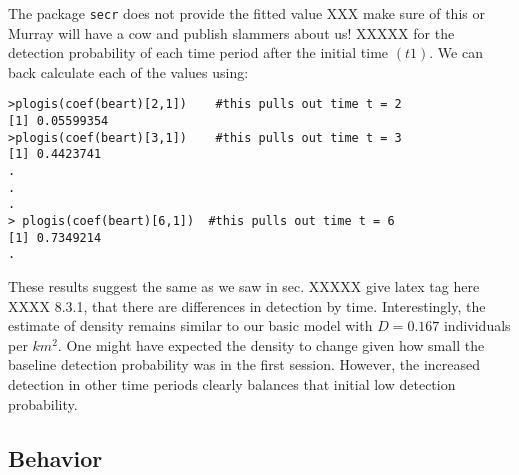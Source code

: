 The package \mbox{\tt secr} does not provide the fitted value XXX make
sure of this or Murray will have a cow and publish slammers about us! XXXXX
for the
detection probability of each time period after the initial time
$(t1)$.  
 We can back calculate each of the values using:
{\small
\begin{verbatim}
>plogis(coef(beart)[2,1])    #this pulls out time t = 2
[1] 0.05599354
>plogis(coef(beart)[3,1])    #this pulls out time t = 3
[1] 0.4423741
.
.
.
> plogis(coef(beart)[6,1])  #this pulls out time t = 6
[1] 0.7349214
.
\end{verbatim}
}
These results suggest the same as we saw in sec. XXXXX give latex tag
here  XXXX 8.3.1, that there
are differences in detection by time.  Interestingly, the estimate of
density remains similar to our basic model with $D = 0.167$ 
individuals per $km ^2$.   
One might have expected the density to change given how
small the baseline detection probability was in the first session.
However, the increased detection in other time periods clearly
balances that initial low detection probability.

\subsection{Behavior}

